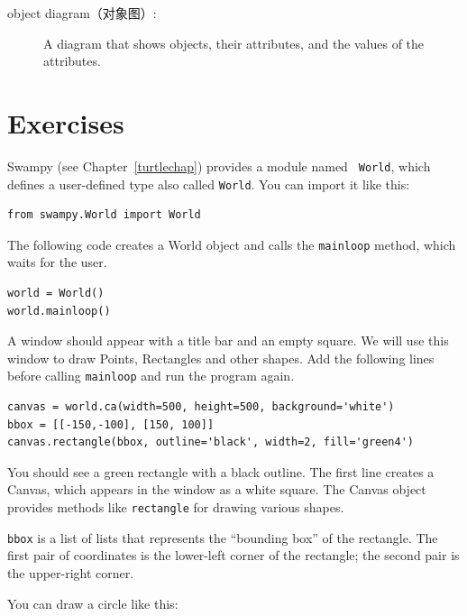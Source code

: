 \documentclass[10pt]{book}
\begin{document}
\begin{CJK}{UTF8}{gbsn}
\begin{description}
\item[object diagram（对象图）:] A diagram that shows objects, their
attributes, and the values of the attributes.

\end{description}


\section{Exercises}

\begin{exercise}
\label{canvas}

Swampy (see Chapter~\ref{turtlechap}) provides a module named {\tt
  World}, which defines a user-defined type also called {\tt World}.
You can import it like this:

\begin{verbatim}
from swampy.World import World
\end{verbatim}

The following code creates a World object and calls
the {\tt mainloop} method, which
waits for the user.

\begin{verbatim}
world = World()
world.mainloop()
\end{verbatim}

A window should appear with a title bar and an empty square.
We will use this window to draw Points,
Rectangles and other shapes.  
Add the following lines before calling
\verb"mainloop" and run the program again.

\begin{verbatim}
canvas = world.ca(width=500, height=500, background='white')
bbox = [[-150,-100], [150, 100]]
canvas.rectangle(bbox, outline='black', width=2, fill='green4')
\end{verbatim}

You should see a green rectangle with a black outline.
The first line creates a Canvas, which appears in the window
as a white square.  The Canvas object provides methods like
{\tt rectangle} for drawing various shapes.

{\tt bbox} is a list of lists that represents the ``bounding box''
of the rectangle.  The first pair of coordinates is the lower-left
corner of the rectangle; the second pair is the upper-right corner.

You can draw a circle like this:


\end{exercise}
\end{CJK}
\end{document}
